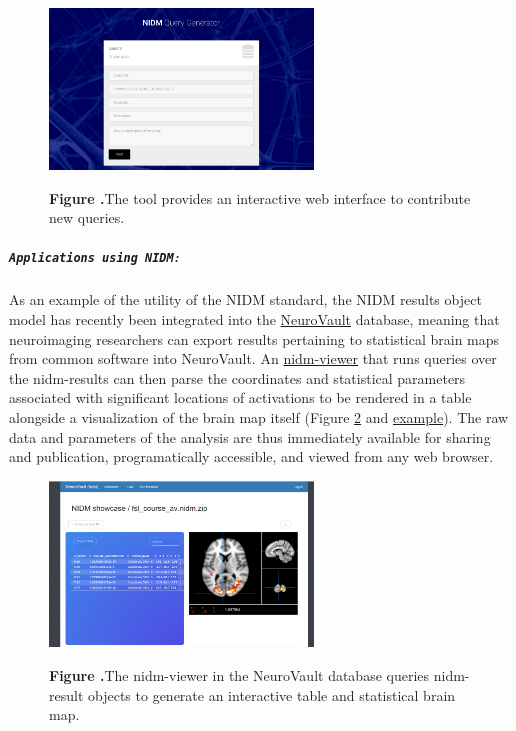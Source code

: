 \documentclass[twocolumn]{bmcart}%
\begin{document}
\begin{figure}[h!]
\begin{center}
\includegraphics[width=7cm]{img/figure2}
\end{center}
 \textbf{\label{fig:02}Figure .}{The tool provides an interactive web interface to contribute new queries.}
\end{figure}

\subparagraph{\texorpdfstring{\texttt{Applications using NIDM}:}{:}}\label{section}
As an example of the utility of the NIDM standard, the NIDM results object model \cite{noauthor_undated-if} has recently been integrated into the \href{http://www.neurovault.org}{NeuroVault} database, meaning that neuroimaging researchers can export results pertaining to statistical brain maps from common software \cite{Jenkinson2012-pr} into NeuroVault. An \href{https://github.com/vsoch/nidmviewer}{nidm-viewer} that runs queries over the nidm-results can then parse the coordinates and statistical parameters associated with significant locations of activations to be rendered in a table alongside a visualization of the brain map itself (Figure \ref{fig:03} and \href{http://neurovault.org/collections/877/fsl_course_av.nidm}{example}). The raw data and parameters of the analysis are thus immediately available for sharing and publication, programatically accessible, and viewed from any web browser. 

\begin{figure}[h!]
\begin{center}
\includegraphics[width=7cm]{img/figure3}
\end{center}
 \textbf{\label{fig:03}Figure .}{The nidm-viewer in the NeuroVault database queries nidm-result objects to generate an interactive table and statistical brain map.}
\end{figure}
\end{document}

